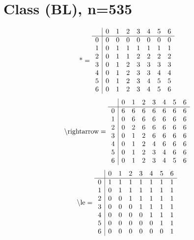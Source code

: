 \documentclass[11pt]{article}
\begin{document}
\section{Class (BL), n=535}
\[\text{*} = 
\begin{array}{r | r r r r r r r}
 & 0 & 1 & 2 & 3 & 4 & 5 & 6 \\ \hline
0 & 0 & 0 & 0 & 0 & 0 & 0 & 0 \\
1 & 0 & 1 & 1 & 1 & 1 & 1 & 1 \\
2 & 0 & 1 & 1 & 2 & 2 & 2 & 2 \\
3 & 0 & 1 & 2 & 3 & 3 & 3 & 3 \\
4 & 0 & 1 & 2 & 3 & 3 & 4 & 4 \\
5 & 0 & 1 & 2 & 3 & 4 & 5 & 5 \\
6 & 0 & 1 & 2 & 3 & 4 & 5 & 6 \\
\end{array}
\]
\[\text{\textbackslash rightarrow} = 
\begin{array}{r | r r r r r r r}
 & 0 & 1 & 2 & 3 & 4 & 5 & 6 \\ \hline
0 & 6 & 6 & 6 & 6 & 6 & 6 & 6 \\
1 & 0 & 6 & 6 & 6 & 6 & 6 & 6 \\
2 & 0 & 2 & 6 & 6 & 6 & 6 & 6 \\
3 & 0 & 1 & 2 & 6 & 6 & 6 & 6 \\
4 & 0 & 1 & 2 & 4 & 6 & 6 & 6 \\
5 & 0 & 1 & 2 & 3 & 4 & 6 & 6 \\
6 & 0 & 1 & 2 & 3 & 4 & 5 & 6 \\
\end{array}
\]
\[\text{\textbackslash le} = 
\begin{array}{r | r r r r r r r}
 & 0 & 1 & 2 & 3 & 4 & 5 & 6 \\ \hline
0 & 1 & 1 & 1 & 1 & 1 & 1 & 1 \\
1 & 0 & 1 & 1 & 1 & 1 & 1 & 1 \\
2 & 0 & 0 & 1 & 1 & 1 & 1 & 1 \\
3 & 0 & 0 & 0 & 1 & 1 & 1 & 1 \\
4 & 0 & 0 & 0 & 0 & 1 & 1 & 1 \\
5 & 0 & 0 & 0 & 0 & 0 & 1 & 1 \\
6 & 0 & 0 & 0 & 0 & 0 & 0 & 1 \\
\end{array}
\]
\end{document}
